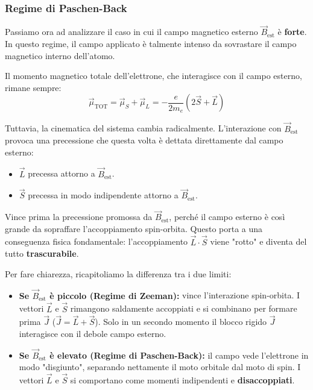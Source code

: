 \subsubsection{Regime di Paschen-Back}
Passiamo ora ad analizzare il caso in cui il campo magnetico esterno \( \vec{B}_{\text{est}} \) è \textbf{forte}. In questo regime, il campo applicato è talmente intenso da sovrastare il campo magnetico interno dell'atomo.

Il momento magnetico totale dell'elettrone, che interagisce con il campo esterno, rimane sempre:
\begin{equation}
    \vec{\mu}_{\text{TOT}} = \vec{\mu}_S + \vec{\mu}_L = -\frac{e}{2m_e} (2\vec{S} + \vec{L})
\end{equation}

Tuttavia, la cinematica del sistema cambia radicalmente. L'interazione con \( \vec{B}_{\text{est}} \) provoca una precessione che questa volta è dettata direttamente dal campo esterno:
\begin{itemize}
    \item \( \vec{L} \) precessa attorno a \( \vec{B}_{\text{est}} \).
    \item \( \vec{S} \) precessa in modo indipendente attorno a \( \vec{B}_{\text{est}} \).
\end{itemize}

Vince prima la precessione promossa da \( \vec{B}_{\text{est}} \), perché il campo esterno è così grande da sopraffare l'accoppiamento spin-orbita. Questo porta a una conseguenza fisica fondamentale: l'accoppiamento \( \vec{L} \cdot \vec{S} \) viene "rotto" e diventa del tutto \textbf{trascurabile}.

Per fare chiarezza, ricapitoliamo la differenza tra i due limiti:
\begin{itemize}
    \item \textbf{Se \( \vec{B}_{\text{est}} \) è piccolo (Regime di Zeeman):} vince l'interazione spin-orbita. I vettori \( \vec{L} \) e \( \vec{S} \) rimangono saldamente accoppiati e si combinano per formare prima \( \vec{J} \) (\( \vec{J} = \vec{L} + \vec{S} \)). Solo in un secondo momento il blocco rigido \( \vec{J} \) interagisce con il debole campo esterno.
    \item \textbf{Se \( \vec{B}_{\text{est}} \) è elevato (Regime di Paschen-Back):} il campo vede l'elettrone in modo "disgiunto", separando nettamente il moto orbitale dal moto di spin. I vettori \( \vec{L} \) e \( \vec{S} \) si comportano come momenti indipendenti e \textbf{disaccoppiati}.
\end{itemize}

